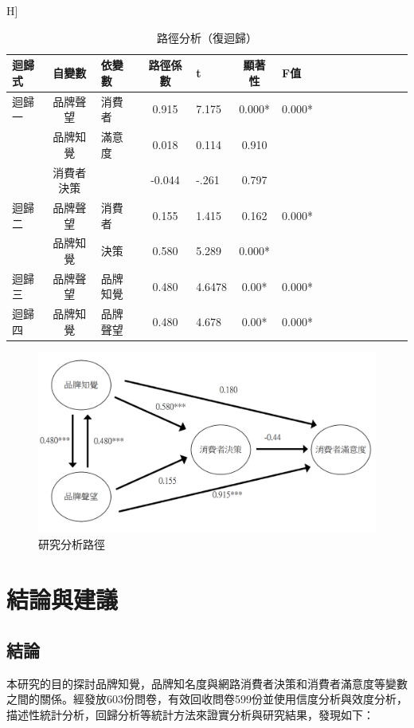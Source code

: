 \begin{table}H]
\caption{路徑分析（復迴歸）}
\label{tab:q1}
\centering
\renewcommand{\arraystretch}{1.2} %
\arrayrulewidth=1pt               %
\tabcolsep=10pt                   %
\begin{tabular}[t]{lclclclclclclcl}  %
\hline
 迴歸式&自變數&依變數&路徑係數&t&顯著性&F值\\
\hline
迴歸一 &品牌聲望&消費者&0.915&7.175&0.000*&0.000*\\
          &品牌知覺&滿意度&0.018&0.114&0.910& \\
          &消費者決策&      &-0.044&-.261&0.797& \\
\hline
迴歸二&品牌聲望&消費者&0.155&1.415&0.162&0.000* \\
          &品牌知覺&決策  &0.580&5.289&0.000*& \\
\hline
迴歸三&品牌聲望&品牌知覺&0.480&4.6478&0.00*&0.000* \\
\hline
迴歸四&品牌知覺&品牌聲望&0.480&4.678&0.00*&0.000* \\
\hline
\end{tabular}
\end{table}

\begin{figure}[h]
\centering
\includegraphics[width=14cm]{images/路徑分析.png}
\caption{研究分析路徑}
\label{fig:ARB}
\end{figure}

\chapter{結論與建議}

\section{結論}
本研究的目的探討品牌知覺，品牌知名度與網路消費者決策和消費者滿意度等變數之間的關係。經發放603份問卷，有效回收問卷599份並使用信度分析與效度分析，描述性統計分析，回歸分析等統計方法來證實分析與研究結果，發現如下：

